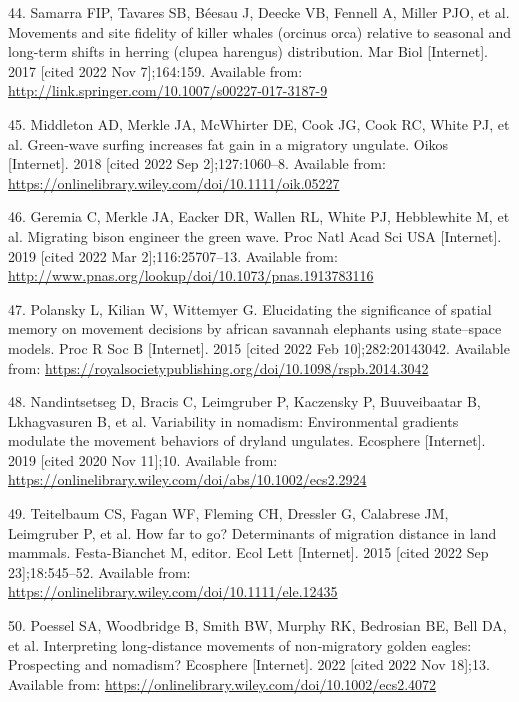 \documentclass[
  12pt,
]{article}
\newlength{\cslhangindent}
\newenvironment{CSLReferences}[2] %
 {\begin{list}{}{%
  \setlength{\itemindent}{0pt}
  \setlength{\leftmargin}{0pt}
  \setlength{\parsep}{0pt}
  \ifodd #1
   \setlength{\leftmargin}{\cslhangindent}
   \setlength{\itemindent}{-1\cslhangindent}
  \fi
  \setlength{\itemsep}{#2\baselineskip}}}
 {\end{list}}
\begin{document}
\begin{CSLReferences}{0}{1}
44. Samarra FIP, Tavares SB, Béesau J, Deecke VB, Fennell A, Miller PJO, et al. Movements and site fidelity of killer whales (orcinus orca) relative to seasonal and long-term shifts in herring (clupea harengus) distribution. Mar Biol {[}Internet{]}. 2017 {[}cited 2022 Nov 7{]};164:159. Available from: \url{http://link.springer.com/10.1007/s00227-017-3187-9}

45. Middleton AD, Merkle JA, McWhirter DE, Cook JG, Cook RC, White PJ, et al. Green-wave surfing increases fat gain in a migratory ungulate. Oikos {[}Internet{]}. 2018 {[}cited 2022 Sep 2{]};127:1060--8. Available from: \url{https://onlinelibrary.wiley.com/doi/10.1111/oik.05227}

46. Geremia C, Merkle JA, Eacker DR, Wallen RL, White PJ, Hebblewhite M, et al. Migrating bison engineer the green wave. Proc Natl Acad Sci {USA} {[}Internet{]}. 2019 {[}cited 2022 Mar 2{]};116:25707--13. Available from: \url{http://www.pnas.org/lookup/doi/10.1073/pnas.1913783116}

47. Polansky L, Kilian W, Wittemyer G. Elucidating the significance of spatial memory on movement decisions by african savannah elephants using state--space models. Proc R Soc B {[}Internet{]}. 2015 {[}cited 2022 Feb 10{]};282:20143042. Available from: \url{https://royalsocietypublishing.org/doi/10.1098/rspb.2014.3042}

48. Nandintsetseg D, Bracis C, Leimgruber P, Kaczensky P, Buuveibaatar B, Lkhagvasuren B, et al. Variability in nomadism: Environmental gradients modulate the movement behaviors of dryland ungulates. Ecosphere {[}Internet{]}. 2019 {[}cited 2020 Nov 11{]};10. Available from: \url{https://onlinelibrary.wiley.com/doi/abs/10.1002/ecs2.2924}

49. Teitelbaum CS, Fagan WF, Fleming CH, Dressler G, Calabrese JM, Leimgruber P, et al. How far to go? Determinants of migration distance in land mammals. Festa-Bianchet M, editor. Ecol Lett {[}Internet{]}. 2015 {[}cited 2022 Sep 23{]};18:545--52. Available from: \url{https://onlinelibrary.wiley.com/doi/10.1111/ele.12435}

50. Poessel SA, Woodbridge B, Smith BW, Murphy RK, Bedrosian BE, Bell DA, et al. Interpreting long‐distance movements of non‐migratory golden eagles: Prospecting and nomadism? Ecosphere {[}Internet{]}. 2022 {[}cited 2022 Nov 18{]};13. Available from: \url{https://onlinelibrary.wiley.com/doi/10.1002/ecs2.4072}


\end{CSLReferences}
\end{document}
